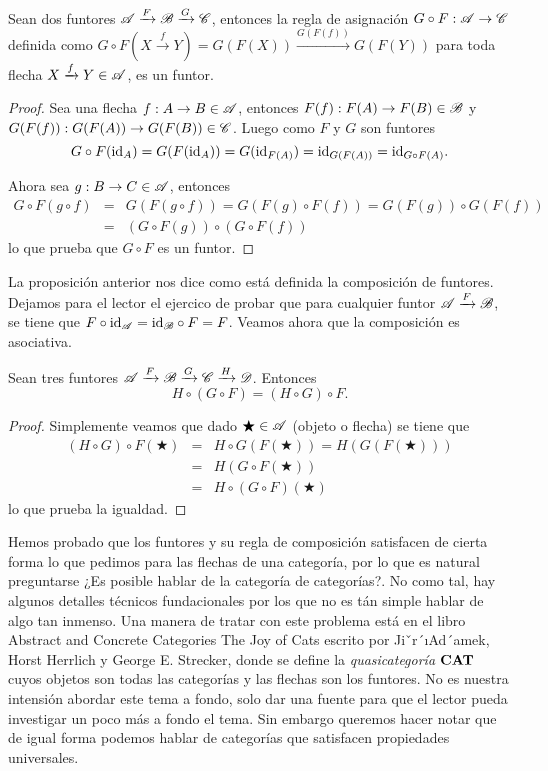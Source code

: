 \documentclass{comunicaciones}
\begin{document}
\begin{prop}
    Sean dos funtores $\mathscr A\xrightarrow{F}\mathscr B\xrightarrow{G}\mathscr C$, entonces la regla de asignación $G\circ F:\mathscr A\to\mathscr C$ definida como 
    $G\circ F(X\xrightarrow{f}Y)=G(F(X))\xrightarrow{G(F(f))}G(F(Y))$ para toda flecha $X\xrightarrow{f}Y\in\mathscr A$, es un funtor.
\end{prop}
\begin{proof}
    Sea una flecha $f:A\to B\in \mathscr A$, entonces $F(f):F(A)\to F(B)\in\mathscr B$ y $G(F(f)):G(F(A))\to G(F(B))\in\mathscr C$.
    Luego como $F$ y $G$ son funtores
    \begin{equation*}
    G\circ F(\mathrm{id}_A) =G(F(\mathrm{id}_A)) =G(\mathrm{id}_{F(A)}) =\mathrm{id}_{G(F(A))}=\mathrm{id}_{G\circ F(A)}.
    \end{equation*}

    Ahora sea $g:B\to C\in\mathscr A$, entonces
    \begin{eqnarray*}
    G\circ F(g\circ f) &=&G(F(g\circ f))=G(F(g)\circ F(f))=G(F(g))\circ G(F(f)) \\
    &=&(G\circ F(g))\circ(G\circ F(f))
    \end{eqnarray*}
    lo que prueba que $G\circ F$ es un funtor.
\end{proof}

La proposición anterior nos dice como está definida la composición de funtores. Dejamos para el lector el ejercico de probar que para cualquier funtor $\mathscr A\xrightarrow{F}\mathscr B$, se tiene que $F\circ\mathrm{id}_\mathscr A=\mathrm{id}_\mathscr B\circ F=F$.
Veamos ahora que la composición es asociativa.

\begin{prop}
    Sean tres funtores $\mathscr A\xrightarrow{F}\mathscr B\xrightarrow{G}\mathscr C\xrightarrow{H}\mathscr D$. Entonces $$H\circ(G\circ F)=(H\circ G)\circ F.$$
\end{prop}
\begin{proof}
    Simplemente veamos que dado $\bigstar\in\mathscr A$ (objeto o flecha) se tiene
    que
    \begin{eqnarray*}
    (H\circ G) \circ F(\bigstar)  &=&
    H\circ G(F(\bigstar) ) =H(G(F(\bigstar)))  \\
    &=&H(G\circ F(\bigstar))  \\
    &=&H\circ(G\circ F)(\bigstar) 
    \end{eqnarray*}
    lo que prueba la igualdad.
\end{proof}

Hemos probado que los funtores y su regla de composición satisfacen de cierta forma lo que pedimos para las flechas de una categoría, por lo que es natural preguntarse
¿Es posible hablar de la categoría de categorías?. No como tal, hay algunos detalles técnicos fundacionales por los que no es tán simple hablar de algo tan inmenso. Una manera de
tratar con este problema está en el libro Abstract and Concrete Categories The Joy of Cats escrito por Jiˇr´ıAd´amek, Horst Herrlich y George E. Strecker, donde se define la 
\emph{quasicategoría} $\mathbf{CAT}$ cuyos objetos son todas las categorías y las flechas son los funtores. No es nuestra intensión abordar este tema a fondo, 
solo dar una fuente para que el lector pueda investigar un poco más a fondo el tema. Sin embargo queremos hacer notar que de igual forma podemos
hablar de categorías que satisfacen propiedades universales.
\end{document}
